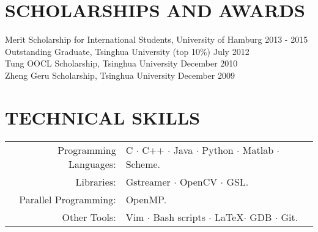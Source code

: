 \documentclass[a4paper,11pt]{article} %
\begin{document}
\section{SCHOLARSHIPS AND AWARDS}

Merit Scholarship for International Students, University of Hamburg \hfill 2013 - 2015 \\
Outstanding Graduate, Tsinghua University (top 10\%) \hfill July 2012 \\
Tung OOCL Scholarship, Tsinghua University \hfill December 2010  \\
Zheng Geru Scholarship, Tsinghua University \hfill December 2009


\section{TECHNICAL SKILLS}

\begin{tabular}{rl}
  Programming Languages: & C $\cdotp$ C++ $\cdotp$ Java $\cdotp$ Python $\cdotp$ Matlab $\cdotp$ Scheme. \\
  Libraries: & Gstreamer $\cdotp$ OpenCV $\cdotp$ GSL. \\
  Parallel Programming: & OpenMP. \\
  Other Tools: & Vim $\cdotp$ Bash scripts $\cdotp$ \LaTeX $\cdotp$ GDB $\cdotp$ Git. \\
\end{tabular}

\end{document}
